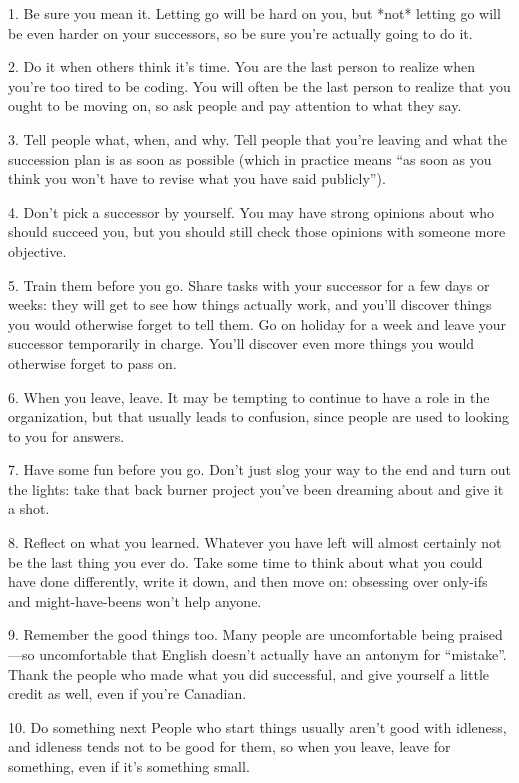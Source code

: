 \documentclass[10pt,letterpaper]{article}
\begin{document}
1.  Be sure you mean it.
    Letting go will be hard on you,
    but *not* letting go will be even harder on your successors,
    so be sure you're actually going to do it.

2.  Do it when others think it's time.
    You are the last person to realize when you're too tired to be coding.
    You will often be the last person to realize that you ought to be moving on,
    so ask people and pay attention to what they say.

3.  Tell people what, when, and why.
    Tell people that you're leaving and what the succession plan is as soon as possible
    (which in practice means ``as soon as you think you won't have to revise what you have said publicly'').

4.  Don't pick a successor by yourself.
    You may have strong opinions about who should succeed you,
    but you should still check those opinions with someone more objective.

5.  Train them before you go.
    Share tasks with your successor for a few days or weeks:
    they will get to see how things actually work,
    and you'll discover things you would otherwise forget to tell them.
    Go on holiday for a week and leave your successor temporarily in charge.
    You'll discover even more things you would otherwise forget to pass on.

6.  When you leave, leave.
    It may be tempting to continue to have a role in the organization,
    but that usually leads to confusion,
    since people are used to looking to you for answers.

7.  Have some fun before you go.
    Don't just slog your way to the end and turn out the lights:
    take that back burner project you've been dreaming about and give it a shot.

8.  Reflect on what you learned.
    Whatever you have left will almost certainly not be the last thing you ever do.
    Take some time to think about what you could have done differently,
    write it down,
    and then move on:
    obsessing over only-ifs and might-have-beens won't help anyone.

9.  Remember the good things too.
    Many people are uncomfortable being praised---so uncomfortable that
    English doesn't actually have an antonym for ``mistake''.
    Thank the people who made what you did successful,
    and give yourself a little credit as well,
    even if you're Canadian.

10. Do something next
    People who start things usually aren't good with idleness,
    and idleness tends not to be good for them,
    so when you leave,
    leave for something,
    even if it's something small.


\end{document}
